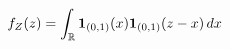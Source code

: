 \documentclass[preview]{standalone}
\begin{document}
\begin{align*}
\special{dvisvgm:raw <g id='unique000'>}f_Z(z)=\int_{\mathbb R}\mathbf1_{(0,1)}(x)\mathbf1_{(0,1)}(z-x)\,dx\special{dvisvgm:raw </g>}
\end{align*}
\end{document}
